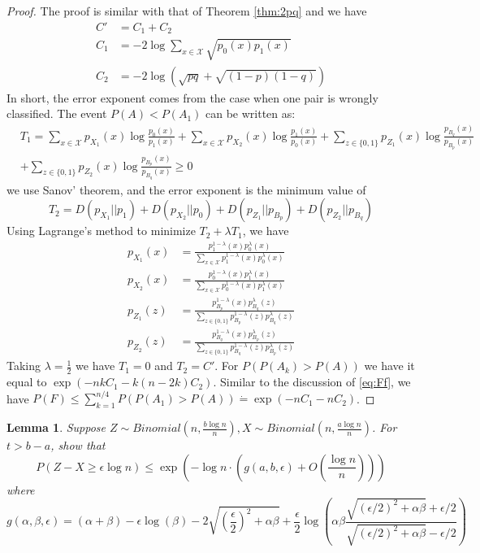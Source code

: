 \documentclass{article}
\newtheorem{lemma}{Lemma}
\begin{document}
\begin{proof}
	The proof is similar with that of Theorem \ref{thm:2pq} and we have
	\begin{align}
	C' &= C_1 + C_2  \\
	C_1 &= - 2 \log \sum_{x\in \mathcal{X}} \sqrt{p_0(x)p_1(x)} \\
	C_2 &= -2 \log(\sqrt{pq} + \sqrt{(1-p)(1-q)}) 
	\end{align}
	In short, the error exponent comes from the case when one pair is wrongly classified.
	The event $P(A) < P(A_1)$ can be written as:
	\begin{align*}
	&T_1 = \sum_{x \in \mathcal{X}} p_{X_1}(x) \log \frac{p_0(x)}{p_1(x)}
	+ \sum_{x \in \mathcal{X}} p_{X_2}(x) \log \frac{p_1(x)}{p_0(x)}
	+ \sum_{z \in \{0,1\}} p_{Z_1}(x) \log \frac{p_{B_q}(x)}{p_{B_p}(x)}\\
	&
	+ \sum_{z \in \{0,1\}} p_{Z_2}(x) \log \frac{p_{B_p}(x)}{p_{B_q}(x)} \geq 0
	\end{align*}
	we use Sanov' theorem, and the error exponent is the minimum value of
	$$
	T_2 = D(p_{X_1} || p_1) + D(p_{X_2} || p_0) + D(p_{Z_1} || p_{B_p}) + D(p_{Z_2} || p_{B_q})
	$$
	Using Lagrange's method to minimize $T_2 + \lambda T_1$, we have
	\begin{align*}
	p_{X_1}(x) &= \frac{p_1^{1-\lambda}(x)p_0^{\lambda}(x)}{\sum_{x\in\mathcal{X}}p_1^{1-\lambda}(x)p_0^{\lambda}(x)} \\
	p_{X_2}(x) &= \frac{p_0^{1-\lambda}(x)p_1^{\lambda}(x)}{\sum_{x\in\mathcal{X}}p_0^{1-\lambda}(x)p_1^{\lambda}(x)} \\	
	p_{Z_1}(z) &= \frac{p_{B_p}^{1-\lambda}(x)p_{B_q}^{\lambda}(z)}{\sum_{z\in\{0,1\} }p_{B_p}^{1-\lambda}(z)p_{B_q}^{\lambda}(z)} \\
	p_{Z_2}(z) &= \frac{p_{B_q}^{1-\lambda}(x)p_{B_p}^{\lambda}(z)}{\sum_{z\in\{0,1\} }p_{B_q}^{1-\lambda}(z)p_{B_p}^{\lambda}(z)}	
	\end{align*}
	Taking $\lambda = \frac{1}{2}$ we have $T_1 = 0$ and $T_2 = C'$.
	For $P(P(A_k) > P(A))$ we have it equal to $\exp(-nk C_1 - k(n-2k)C_2)$.
	Similar to the discussion of \eqref{eq:Ff}, we have
	$P(F) \leq \sum_{k=1}^{n/4}P(P(A_1) > P(A)) \dot{=} \exp(-nC_1 - nC_2)$.
\end{proof}
\begin{lemma}
	Suppose $Z \sim Binomial(n, \frac{b\log n}{n}), X\sim Binomial(n, \frac{a\log n}{n})$.
	For $ t > b - a$, show that
	\begin{equation}
	P(Z - X \geq \epsilon \log n) \leq \exp(-\log n \cdot ( g(a, b, \epsilon) + O(\frac{\log n}{n})))
	\end{equation}
	where
	\begin{equation}\label{eq:galphabeta}
	g(\alpha,\beta,\epsilon)= (\alpha+\beta)-\epsilon \log(\beta) - 2\sqrt{\left( \frac{\epsilon}{2}\right)^2 +\alpha \beta} +\frac{\epsilon}{2} \log \left( \alpha \beta \frac{\sqrt{(\epsilon/2)^2 +\alpha \beta} +\epsilon/2}{\sqrt{(\epsilon/2)^2 +\alpha \beta} -\epsilon/2} \right)
	\end{equation}
\end{lemma}
\end{document}
